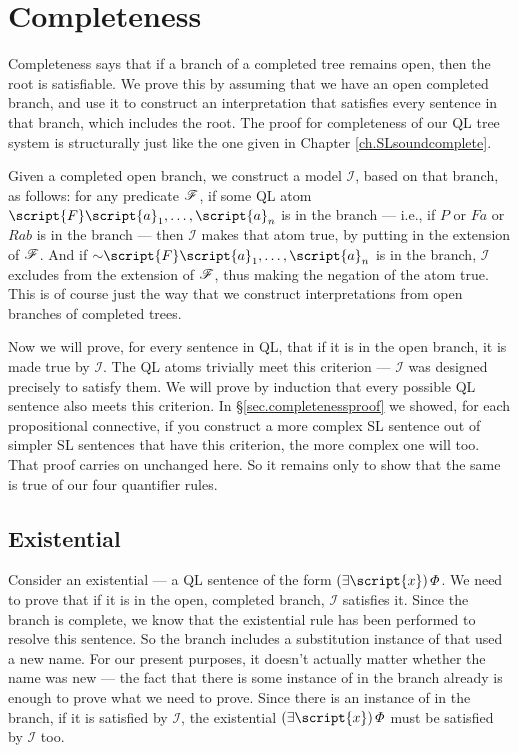 \section{Completeness}

Completeness says that if a branch of a completed tree remains open, then the root is satisfiable. We prove this by assuming that we have an open completed branch, and use it to construct an interpretation that satisfies every sentence in that branch, which includes the root. The proof for completeness of our QL tree system is structurally just like the one given in Chapter \ref{ch.SLsoundcomplete}.

Given a completed open branch, we construct a model $\mathcal{I}$, based on that branch, as follows: for any predicate $\mathscr{F}$\!, if some QL atom $\script{F}\script{a}_{1}, \ldots, \script{a}_{n}$ is in the branch --- i.e., if $P$ or $Fa$ or $Rab$ is in the branch --- then $\mathcal{I}$ makes that atom true, by putting  in the extension of $\mathscr{F}$\!. And if $\enot \script{F}\script{a}_{1}, \ldots, \script{a}_{n}$ is in the branch, $\mathcal{I}$ excludes  from the extension of $\mathscr{F}$\!, thus making the negation of the atom true. This is of course just the way that we construct interpretations from open branches of completed trees.

Now we will prove, for every sentence in QL, that if it is in the open branch, it is made true by $\mathcal{I}$. The QL atoms trivially meet this criterion --- $\mathcal{I}$ was designed precisely to satisfy them. We will prove by induction that every possible QL sentence also meets this criterion. In \S\ref{sec.completenessproof} we showed, for each propositional connective, if you construct a more complex SL sentence out of simpler SL sentences that have this criterion, the more complex one will too. That proof carries on unchanged here. So it remains only to show that the same is true of our four quantifier rules.

\subsection{Existential}

Consider an existential --- a QL sentence of the form $\qt{\exists}{\script{x}} \metaA{}$. We need to prove that if it is in the open, completed branch, $\mathcal{I}$ satisfies it. Since the branch is complete, we know that the existential rule has been performed to resolve this sentence. So the branch includes a substitution instance of \metaA{} that used a new name. For our present purposes, it doesn't actually matter whether the name was new --- the fact that there is some instance of \metaA{} in the branch already is enough to prove what we need to prove. Since there is an instance of \metaA{} in the branch, if it is satisfied by $\mathcal{I}$, the existential $\qt{\exists}{\script{x}} \metaA{}$ must be satisfied by $\mathcal{I}$ too.

